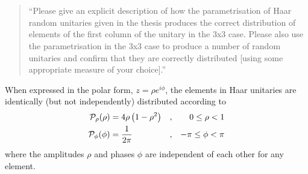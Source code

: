 \documentclass[a4paper,11pt]{article}
\begin{document}
\section{}
\begin{quote}
  ``Please give an explicit description of how the parametrisation of
  Haar random unitaries given in the thesis produces the correct
  distribution of elements of the first column of the unitary in the 3x3
  case.  Please also use the parametrisation in the 3x3 case to produce
  a number of random unitaries and confirm that they are correctly
  distributed [using some appropriate measure of your choice].''
\end{quote}
When expressed in the polar form, \(z=\rho e^{i\phi}\), the elements in Haar
unitaries are identically (but not independently) distributed according to
\begin{align}
  \label{eq:rho}
  \mathcal{P}_{\rho} \!\left(\rho\right) &= 4\rho\left(1-\rho^{2}\right) &,
    && 0 \leq \rho < 1 \\
  \label{eq:phi}
  \mathcal{P}_{\phi} \!\left(\phi\right) &= \frac{1}{2\pi} &, && -\pi \leq \phi < \pi
\end{align}
where the amplitudes \(\rho\) and phases \(\phi\) are independent of each other
for any element.
\end{document}
